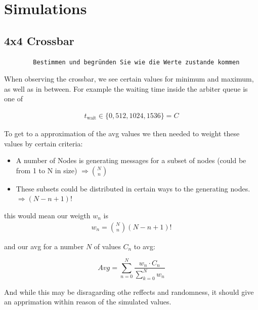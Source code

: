 \documentclass[]{scrartcl}
\begin{document}
    \section{Simulations}
    \subsection{4x4 Crossbar}
    \begin{verbatim}
        Bestimmen und begründen Sie wie die Werte zustande kommen
    \end{verbatim}

    When observing the crossbar, we see certain values for minimum and maximum, as well as in between. For example the waiting time inside the arbiter queue is one of

    \begin{align}
        t_\text{wait} \in \{ 0, 512, 1024, 1536 \} = C
    \end{align}

    To get to a approximation of the avg values we then needed to weight these values by certain criteria:

    \begin{itemize}
        \item A number of Nodes is generating messages for a subset of nodes (could be from 1 to N in size) $\Rightarrow \binom{N}{n}$
        \item These subsets could be distributed in certain ways to the generating nodes. $\Rightarrow (N-n+1)!$
    \end{itemize}

    this would mean our weigth $w_n$ is
    \begin{align}
        w_n= \binom{N}{n}\left( N-n+1 \right)!
    \end{align}

    and our avg for a number $N$ of values $C_n$ to avg:

    \begin{equation}
        Avg = \sum_{n=0}^N \frac{w_n \cdot C_n }{\sum_{k=0}^N w_n}
    \end{equation}

    And while this may be disragarding othe reffects and randomness, it should give an apprimation within reason of the simulated values.
\end{document}
